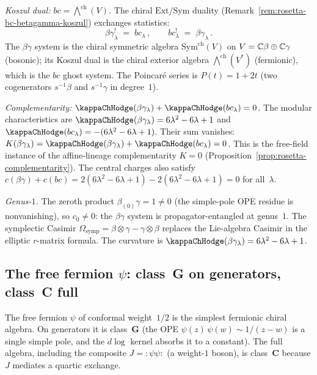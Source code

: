 \begin{computation}
\smallskip
\noindent
\emph{Koszul dual: $bc = \bigwedge^{\mathrm{ch}}(V)$.}
The chiral $\mathrm{Ext}/\mathrm{Sym}$ duality
(Remark~\ref{rem:rosetta-bc-betagamma-koszul})
exchanges statistics:
\begin{equation}\label{eq:betagamma-koszul-dual}
\beta\gamma_\lambda^!
\;=\;
bc_\lambda\,,
\qquad
bc_\lambda^!
\;=\;
\beta\gamma_\lambda\,.
\end{equation}
The $\beta\gamma$ system is the chiral symmetric algebra
$\mathrm{Sym}^{\mathrm{ch}}(V)$
on $V = \mathbb{C}\beta \oplus \mathbb{C}\gamma$ (bosonic); its
Koszul dual is the chiral exterior algebra
$\bigwedge^{\mathrm{ch}}(V^*)$ (fermionic), which is the
$bc$ ghost system.
The Poincar\'{e} series is $P(t) = 1 + 2t$
(two cogenerators $s^{-1}\beta$ and $s^{-1}\gamma$
in degree~$1$).

\smallskip
\noindent
\emph{Complementarity: $\kappaChHodge(\beta\gamma_\lambda) + \kappaChHodge(bc_\lambda) = 0$.}
The modular characteristics are
$\kappaChHodge(\beta\gamma_\lambda) = 6\lambda^2 - 6\lambda + 1$ and
$\kappaChHodge(bc_\lambda) = -(6\lambda^2 - 6\lambda + 1)$.
Their sum vanishes:
$K(\beta\gamma_\lambda) = \kappaChHodge(\beta\gamma_\lambda) + \kappaChHodge(bc_\lambda) = 0$.
This is the free-field instance of the affine-lineage
complementarity $K = 0$
(Proposition~\ref{prop:rosetta-complementarity}).
The central charges also satisfy
$c(\beta\gamma) + c(bc)
= 2(6\lambda^2 - 6\lambda + 1) - 2(6\lambda^2 - 6\lambda + 1) = 0$
for all~$\lambda$.

\smallskip
\noindent
\emph{Genus-$1$.}
The zeroth product $\beta_{(0)}\gamma = 1 \ne 0$ (the simple-pole OPE residue is nonvanishing), so $c_0 \ne 0$: the $\beta\gamma$ system is propagator-entangled at genus~$1$.
The symplectic Casimir $\Omega_{\mathrm{symp}}
= \beta \otimes \gamma - \gamma \otimes \beta$
replaces the Lie-algebra Casimir in the elliptic
$r$-matrix formula. The curvature is
$\kappaChHodge(\beta\gamma_\lambda) = 6\lambda^2 - 6\lambda + 1$.
\end{computation}

\subsection{The free fermion $\psi$: class~G on generators, class~C full}%
\label{subsec:free-fermion-ordered-bar}%
%

The free fermion $\psi$ of conformal weight~$1/2$ is the
simplest fermionic chiral algebra. On generators it is
class~$\mathbf{G}$ (the OPE $\psi(z)\,\psi(w) \sim 1/(z-w)$
is a single simple pole, and the $d\log$ kernel absorbs it
to a constant). The full algebra, including the composite
$J = {:}\psi\psi{:}$ (a weight-$1$ boson), is class~$\mathbf{C}$
because $J$ mediates a quartic exchange.

